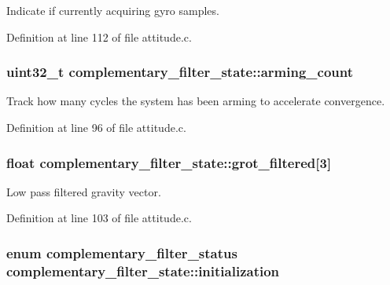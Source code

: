 \-Indicate if currently acquiring gyro samples. 



\-Definition at line 112 of file attitude.\-c.

\hypertarget{structcomplementary__filter__state_a25592bc35eb34062d082854dd0dbce44}{
\subsubsection[{arming\-\_\-count}]{\setlength{\rightskip}{0pt plus 5cm}uint32\-\_\-t {\bf complementary\-\_\-filter\-\_\-state\-::arming\-\_\-count}}}\label{structcomplementary__filter__state_a25592bc35eb34062d082854dd0dbce44}


\-Track how many cycles the system has been arming to accelerate convergence. 



\-Definition at line 96 of file attitude.\-c.

\hypertarget{structcomplementary__filter__state_a91176df07de5e650a8afe8bec74d3ce1}{
\subsubsection[{grot\-\_\-filtered}]{\setlength{\rightskip}{0pt plus 5cm}float {\bf complementary\-\_\-filter\-\_\-state\-::grot\-\_\-filtered}\mbox{[}3\mbox{]}}}\label{structcomplementary__filter__state_a91176df07de5e650a8afe8bec74d3ce1}


\-Low pass filtered gravity vector. 



\-Definition at line 103 of file attitude.\-c.

\hypertarget{structcomplementary__filter__state_a28dd748e22efb34aa6dddf4873b1c445}{
\subsubsection[{initialization}]{\setlength{\rightskip}{0pt plus 5cm}enum {\bf complementary\-\_\-filter\-\_\-status} {\bf complementary\-\_\-filter\-\_\-state\-::initialization}}}\label{structcomplementary__filter__state_a28dd748e22efb34aa6dddf4873b1c445}


